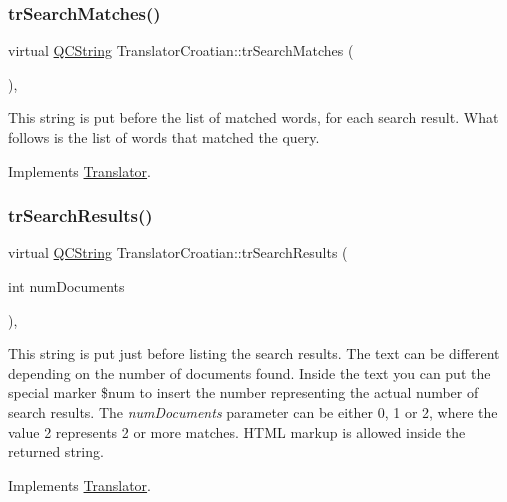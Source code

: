 \subsubsection{\texorpdfstring{trSearchMatches()}{trSearchMatches()}}
{\footnotesize\ttfamily virtual \mbox{\hyperlink{class_q_c_string}{Q\+C\+String}} Translator\+Croatian\+::tr\+Search\+Matches (\begin{DoxyParamCaption}{ }\end{DoxyParamCaption})\hspace{0.3cm}{\ttfamily [inline]}, {\ttfamily [virtual]}}

This string is put before the list of matched words, for each search result. What follows is the list of words that matched the query. 

Implements \mbox{\hyperlink{class_translator}{Translator}}.

\mbox{\label{class_translator_croatian_a5ee45a6e21d78cdc53e6ed2e36ba8285}} 
\subsubsection{\texorpdfstring{trSearchResults()}{trSearchResults()}}
{\footnotesize\ttfamily virtual \mbox{\hyperlink{class_q_c_string}{Q\+C\+String}} Translator\+Croatian\+::tr\+Search\+Results (\begin{DoxyParamCaption}\item[{int}]{num\+Documents }\end{DoxyParamCaption})\hspace{0.3cm}{\ttfamily [inline]}, {\ttfamily [virtual]}}

This string is put just before listing the search results. The text can be different depending on the number of documents found. Inside the text you can put the special marker \$num to insert the number representing the actual number of search results. The {\itshape num\+Documents} parameter can be either 0, 1 or 2, where the value 2 represents 2 or more matches. H\+T\+ML markup is allowed inside the returned string. 

Implements \mbox{\hyperlink{class_translator}{Translator}}.

\mbox{\label{class_translator_croatian_ace8f65acf8eb74d456c987d6d63b4a7d}} 
